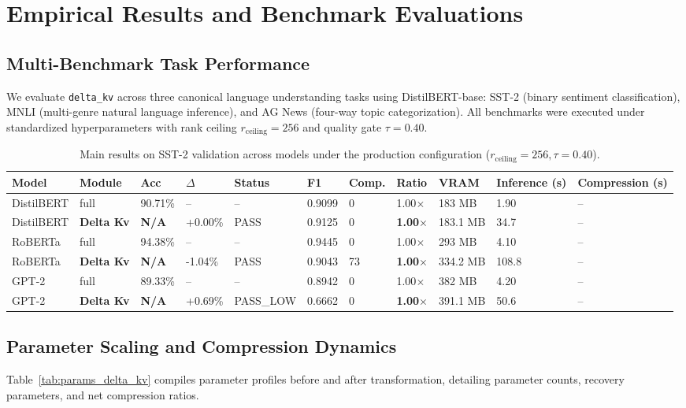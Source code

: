 \section{Empirical Results and Benchmark Evaluations}
\label{sec:results}

\subsection{Multi-Benchmark Task Performance}
We evaluate \texttt{delta\_kv} across three canonical language understanding tasks using DistilBERT-base: SST-2 (binary sentiment classification), MNLI (multi-genre natural language inference), and AG News (four-way topic categorization). All benchmarks were executed under standardized hyperparameters with rank ceiling $r_{\mathrm{ceiling}} = 256$ and quality gate $\tau = 0.40$.

\begin{table}[t]
\centering
\small
\begin{tabular}{lllllllllll}
\toprule
\textbf{Model} & \textbf{Module} & \textbf{Acc} & \textbf{$\Delta$} & \textbf{Status} & \textbf{F1} & \textbf{Comp.} & \textbf{Ratio} & \textbf{VRAM} & \textbf{Inference (s)} & \textbf{Compression (s)} \\
\midrule
DistilBERT & full & 90.71\% & -- & -- & 0.9099 & 0 & 1.00$\times$ & 183 MB & 1.90 & -- \\
DistilBERT & \textbf{Delta Kv} & \textbf{N/A} & +0.00\% & PASS & 0.9125 & 0 & \textbf{1.00$\times$} & 183.1 MB & 34.7 & -- \\
RoBERTa & full & 94.38\% & -- & -- & 0.9445 & 0 & 1.00$\times$ & 293 MB & 4.10 & -- \\
RoBERTa & \textbf{Delta Kv} & \textbf{N/A} & -1.04\% & PASS & 0.9043 & 73 & \textbf{1.00$\times$} & 334.2 MB & 108.8 & -- \\
GPT-2 & full & 89.33\% & -- & -- & 0.8942 & 0 & 1.00$\times$ & 382 MB & 4.20 & -- \\
GPT-2 & \textbf{Delta Kv} & \textbf{N/A} & +0.69\% & PASS\_LOW & 0.6662 & 0 & \textbf{1.00$\times$} & 391.1 MB & 50.6 & -- \\
\bottomrule
\end{tabular}
\caption{Main results on SST-2 validation across models under the production configuration ($r_{\mathrm{ceiling}}=256, \tau=0.40$).}
\label{tab:main_sst2}
\end{table}

\subsection{Parameter Scaling and Compression Dynamics}
Table~\ref{tab:params_delta_kv} compiles parameter profiles before and after transformation, detailing parameter counts, recovery parameters, and net compression ratios.

